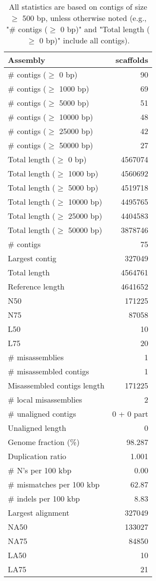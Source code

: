 \documentclass[12pt,a4paper]{article}
\begin{document}
\begin{table}[ht]
\begin{center}
\caption{All statistics are based on contigs of size $\geq$ 500 bp, unless otherwise noted (e.g., "\# contigs ($\geq$ 0 bp)" and "Total length ($\geq$ 0 bp)" include all contigs).}
\begin{tabular}{|l*{1}{|r}|}
\hline
Assembly & scaffolds \\ \hline
\# contigs ($\geq$ 0 bp) & 90 \\ \hline
\# contigs ($\geq$ 1000 bp) & 69 \\ \hline
\# contigs ($\geq$ 5000 bp) & 51 \\ \hline
\# contigs ($\geq$ 10000 bp) & 48 \\ \hline
\# contigs ($\geq$ 25000 bp) & 42 \\ \hline
\# contigs ($\geq$ 50000 bp) & 27 \\ \hline
Total length ($\geq$ 0 bp) & 4567074 \\ \hline
Total length ($\geq$ 1000 bp) & 4560692 \\ \hline
Total length ($\geq$ 5000 bp) & 4519718 \\ \hline
Total length ($\geq$ 10000 bp) & 4495765 \\ \hline
Total length ($\geq$ 25000 bp) & 4404583 \\ \hline
Total length ($\geq$ 50000 bp) & 3878746 \\ \hline
\# contigs & 75 \\ \hline
Largest contig & 327049 \\ \hline
Total length & 4564761 \\ \hline
Reference length & 4641652 \\ \hline
N50 & 171225 \\ \hline
N75 & 87058 \\ \hline
L50 & 10 \\ \hline
L75 & 20 \\ \hline
\# misassemblies & 1 \\ \hline
\# misassembled contigs & 1 \\ \hline
Misassembled contigs length & 171225 \\ \hline
\# local misassemblies & 2 \\ \hline
\# unaligned contigs & 0 + 0 part \\ \hline
Unaligned length & 0 \\ \hline
Genome fraction (\%) & 98.287 \\ \hline
Duplication ratio & 1.001 \\ \hline
\# N's per 100 kbp & 0.00 \\ \hline
\# mismatches per 100 kbp & 62.87 \\ \hline
\# indels per 100 kbp & 8.83 \\ \hline
Largest alignment & 327049 \\ \hline
NA50 & 133027 \\ \hline
NA75 & 84850 \\ \hline
LA50 & 10 \\ \hline
LA75 & 21 \\ \hline
\end{tabular}
\end{center}
\end{table}
\end{document}
